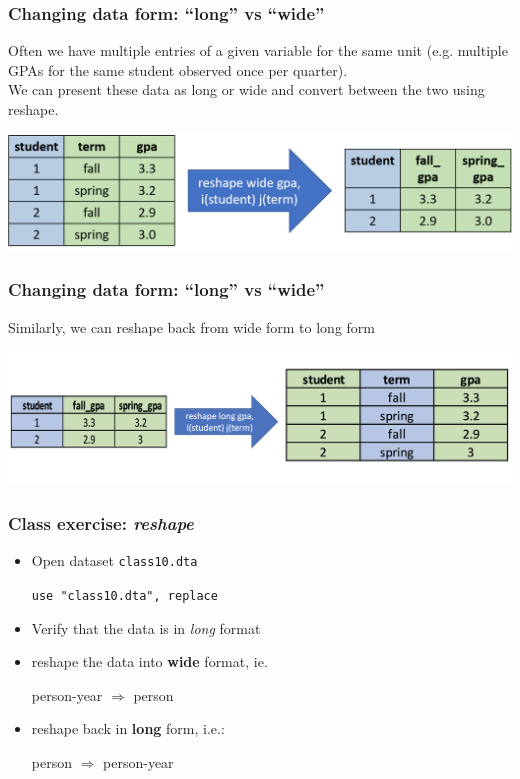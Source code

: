 \documentclass[11pt]{beamer}
\begin{document}
\begin{frame}
\frametitle{Changing data form: ``long'' vs ``wide''}
Often we have multiple entries of a given variable for the same unit (e.g. multiple GPAs for the same student observed once per quarter). \\ \bigskip
We can present these data as \alert{long} or \alert{wide} and convert between the two using \alert{reshape}.
\begin{center}
	\includegraphics[width=\textwidth]{images/reshape.png}
\end{center} 
\end{frame}


\begin{frame}
\frametitle{Changing data form: ``long'' vs ``wide''}
Similarly, we can reshape back from wide form to long form
\begin{center}
	\includegraphics[width=\textwidth]{images/reshape_long.png}
\end{center} 
\end{frame}


\begin{frame}
\frametitle{Class exercise: \textit{reshape}}
\begin{itemize}
\item Open dataset \texttt{class10.dta} \\
\centerline{\texttt{use "class10.dta", replace}}
\item Verify that the data is in \textit{long} format
\item reshape the data into \textbf{wide} format, ie.\\
\centerline{person-year $\Rightarrow$ person}
\item reshape back in \textbf{long} form, i.e.: \\
\centerline{person $\Rightarrow$ person-year}
\end{itemize}
\end{frame}
\end{document}
